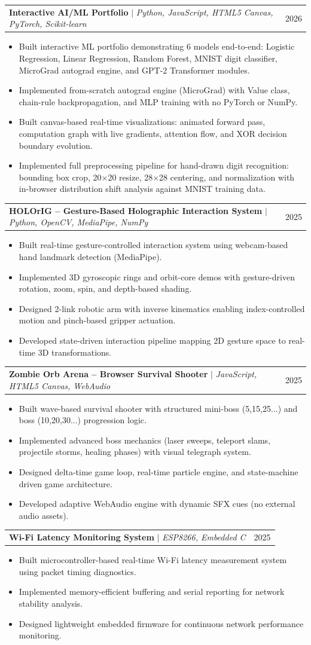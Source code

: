 \documentclass[letterpaper,11pt]{article}
\makeatletter
\newcommand{\resumeItem}[1]{
  \item\small{
    {#1 \vspace{-2pt}}
  }
}
\newcommand{\resumeProjectHeading}[2]{
    \item
    \begin{tabular*}{0.97\textwidth}{l@{\extracolsep{\fill}}r}
      \small#1 & #2 \\
    \end{tabular*}\vspace{-7pt}
}
\newcommand{\resumeItemListStart}{\begin{itemize}}
\newcommand{\resumeItemListEnd}{\end{itemize}\vspace{-5pt}}
\makeatother
\begin{document}
\resumeProjectHeading
{\textbf{Interactive AI/ML Portfolio} $|$ \emph{Python, JavaScript, HTML5 Canvas, PyTorch, Scikit-learn}}{2026}
\resumeItemListStart
\resumeItem{Built interactive ML portfolio demonstrating 6 models end-to-end: Logistic Regression, Linear Regression, Random Forest, MNIST digit classifier, MicroGrad autograd engine, and GPT-2 Transformer modules.}
\resumeItem{Implemented from-scratch autograd engine (MicroGrad) with Value class, chain-rule backpropagation, and MLP training with no PyTorch or NumPy.}
\resumeItem{Built canvas-based real-time visualizations: animated forward pass, computation graph with live gradients, attention flow, and XOR decision boundary evolution.}
\resumeItem{Implemented full preprocessing pipeline for hand-drawn digit recognition: bounding box crop, 20×20 resize, 28×28 centering, and normalization with in-browser distribution shift analysis against MNIST training data.}
\resumeItemListEnd


\resumeProjectHeading
{\textbf{HOLOrIG – Gesture-Based Holographic Interaction System} $|$ \emph{Python, OpenCV, MediaPipe, NumPy}}{2025}
\resumeItemListStart
\resumeItem{Built real-time gesture-controlled interaction system using webcam-based hand landmark detection (MediaPipe).}
\resumeItem{Implemented 3D gyroscopic rings and orbit-core demos with gesture-driven rotation, zoom, spin, and depth-based shading.}
\resumeItem{Designed 2-link robotic arm with inverse kinematics enabling index-controlled motion and pinch-based gripper actuation.}
\resumeItem{Developed state-driven interaction pipeline mapping 2D gesture space to real-time 3D transformations.}
\resumeItemListEnd


\resumeProjectHeading
{\textbf{Zombie Orb Arena – Browser Survival Shooter} $|$ \emph{JavaScript, HTML5 Canvas, WebAudio}}{2025}
\resumeItemListStart
\resumeItem{Built wave-based survival shooter with structured mini-boss (5,15,25...) and boss (10,20,30...) progression logic.}
\resumeItem{Implemented advanced boss mechanics (laser sweeps, teleport slams, projectile storms, healing phases) with visual telegraph system.}
\resumeItem{Designed delta-time game loop, real-time particle engine, and state-machine driven game architecture.}
\resumeItem{Developed adaptive WebAudio engine with dynamic SFX cues (no external audio assets).}
\resumeItemListEnd


\resumeProjectHeading
{\textbf{Wi-Fi Latency Monitoring System} $|$ \emph{ESP8266, Embedded C}}{2025}
\resumeItemListStart
\resumeItem{Built microcontroller-based real-time Wi-Fi latency measurement system using packet timing diagnostics.}
\resumeItem{Implemented memory-efficient buffering and serial reporting for network stability analysis.}
\resumeItem{Designed lightweight embedded firmware for continuous network performance monitoring.}
\resumeItemListEnd




%


\end{document}
